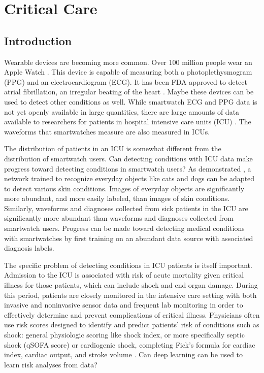 

\chapter{Critical Care}

\section{Introduction}
Wearable devices are becoming more common.  Over 100 million people wear an Apple Watch \cite{cybart_2021}.  This device is capable of measuring both a photoplethysmogram (PPG) and an electrocardiogram (ECG).  It has been FDA approved to detect atrial fibrillation, an irregular beating of the heart \cite{perez2019large}.  Maybe these devices can be used to detect other conditions as well.  While smartwatch ECG and PPG data is not yet openly available in large quantities, there are large amounts of data available to researchers for patients in hospital intensive care units (ICU) \cite{johnson2016mimic}.  The waveforms that smartwatches measure are also measured in ICUs.

The distribution of patients in an ICU is somewhat different from the distribution of smartwatch users.  Can detecting conditions with ICU data make progress toward detecting conditions in smartwatch users?  As demonstrated \cite{kuprel2017dermatologist}, a network trained to recognize everyday objects like cats and dogs can be adapted to detect various skin conditions.  Images of everyday objects are significantly more abundant, and more easily labeled, than images of skin conditions.  Similarly, waveforms and diagnoses collected from sick patients in the ICU are significantly more abundant than waveforms and diagnoses collected from smartwatch users.  Progress can be made toward detecting medical conditions with smartwatches by first training on an abundant data source with associated diagnosis labels.  

The specific problem of detecting conditions in ICU patients is itself important.  Admission to the ICU is associated with risk of acute mortality given critical illness for those patients, which can include shock and end organ damage. During this period, patients are closely monitored in the intensive care setting with both invasive and noninvasive sensor data and frequent lab monitoring in order to effectively determine and prevent complications of critical illness.  Physicians often use risk scores designed to identify and predict patients’ risk of conditions such as shock: general physiologic scoring like shock index, or more specifically septic shock (qSOFA score) \cite{seymour2016assessment} or cardiogenic shock, completing Fick’s formula for cardiac index, cardiac output, and stroke volume \cite{fick1870ueber}.  Can deep learning can be used to learn risk analyses from data?

